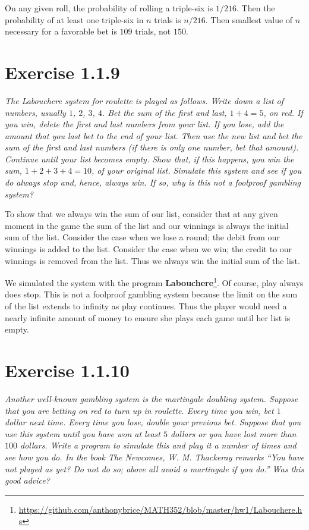 \documentclass{tufte-handout}
\begin{document}
On any given roll, the probability of rolling a triple-six is $1/216$. Then
the probability of at least one triple-six in $n$ trials is
$n/216$. Then smallest value of $n$ necessary for a favorable bet is $109$
trials, not $150$.

\section{Exercise 1.1.9}

\begin{description}
\item \textit{The \textit{Labouchere system} for roulette is played as
    follows. Write down a list of numbers, usually $1$, $2$, $3$,
    $4$. Bet the sum of the first and last, $1+4 = 5$, on red. If you
    win, delete the first and last numbers from your list. If you
    lose, add the amount that you last bet to the end of your
    list. Then use the new list and bet the sum of the first and last
    numbers (if there is only one number, bet that amount). Continue
    until your list becomes empty. Show that, if this happens, you win
    the sum, $1+2+3+4 = 10$, of your original list. Simulate this
    system and see if you do always stop and, hence, always win. If
    so, why is this not a foolproof gambling system?}
\end{description}

To show that we always win the sum of our list, consider that at any
given moment in the game the sum of the list and our winnings is
always the initial sum of the list. Consider the case when we lose a
round; the debit from our winnings is added to the list. Consider the
case when we win; the credit to our winnings is removed from the
list. Thus we always win the initial sum of the list.

We simulated the system with the program \textbf{Labouchere}\footnote{
  \url{https://github.com/anthonybrice/MATH352/blob/master/hw1/Labouchere.hs}}.
Of course, play always does stop. This is not a foolproof gambling system
because the limit on the sum of the list extends to infinity as play
continues. Thus the player would need a nearly infinite amount of
money to ensure she plays each game until her list is empty.

\section{Exercise 1.1.10}

\begin{description}
\item \textit{Another well-known gambling system is the martingale
    doubling system. Suppose that you are betting on red to turn up in
    roulette. Every time you win, bet $1$ dollar next time. Every time
    you lose, double your previous bet. Suppose that you use this
    system until you have won at least $5$ dollars or you have lost
    more than $100$ dollars. Write a program to simulate this and play
    it a number of times and see how you do. In the book \emph{The
      Newcomes}, W. M. Thackeray remarks ``You have not played as yet?
    Do not do so; above all avoid a martingale if you do.'' Was this
    good advice?}
\end{description}
\end{document}

